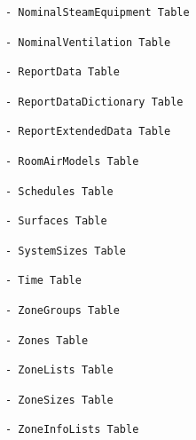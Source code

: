 \begin{lstlisting}
- NominalSteamEquipment Table
\end{lstlisting}

\begin{lstlisting}
- NominalVentilation Table
\end{lstlisting}

\begin{lstlisting}
- ReportData Table
\end{lstlisting}

\begin{lstlisting}
- ReportDataDictionary Table
\end{lstlisting}

\begin{lstlisting}
- ReportExtendedData Table
\end{lstlisting}

\begin{lstlisting}
- RoomAirModels Table
\end{lstlisting}

\begin{lstlisting}
- Schedules Table
\end{lstlisting}

\begin{lstlisting}
- Surfaces Table
\end{lstlisting}

\begin{lstlisting}
- SystemSizes Table
\end{lstlisting}

\begin{lstlisting}
- Time Table
\end{lstlisting}

\begin{lstlisting}
- ZoneGroups Table
\end{lstlisting}

\begin{lstlisting}
- Zones Table
\end{lstlisting}

\begin{lstlisting}
- ZoneLists Table
\end{lstlisting}

\begin{lstlisting}
- ZoneSizes Table
\end{lstlisting}

\begin{lstlisting}
- ZoneInfoLists Table
\end{lstlisting}


